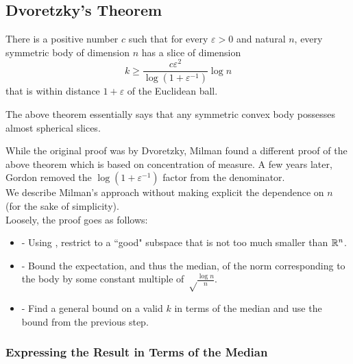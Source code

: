 \clearpage
\subsection{Dvoretzky's Theorem}

\begin{ftheo}
\label{dvoretzkys theorem}
There is a positive number $c$ such that for every $\varepsilon>0$ and natural $n$, every symmetric body of dimension $n$ has a slice of dimension
\[ k \geq \frac{c\varepsilon^2}{\log(1+\varepsilon^{-1})} \log n \]
that is within distance $1+\varepsilon$ of the Euclidean ball.
\end{ftheo}

The above theorem essentially says that any symmetric convex body possesses almost spherical slices.

While the original proof was by Dvoretzky, Milman found a different proof of the above theorem which is based on concentration of measure. A few years later, Gordon removed the $\log(1+\varepsilon^{-1})$ factor from the denominator.\\
We describe Milman's approach without making explicit the dependence on $n$ (for the sake of simplicity).\\

Loosely, the proof goes as follows:
\begin{itemize}
    \item {} - Using , restrict to a ``good" subspace that is not too much smaller than $\mathbb{R}^n$.
    \item {} - Bound the expectation, and thus the median, of the norm corresponding to the body by some constant multiple of $\sqrt\frac{\log n}{n}$.
    \item {} - Find a general bound on a valid $k$ in terms of the median and use the bound from the previous step. 
\end{itemize}

\subsubsection{Expressing the Result in Terms of the Median}
\label{median bound}

